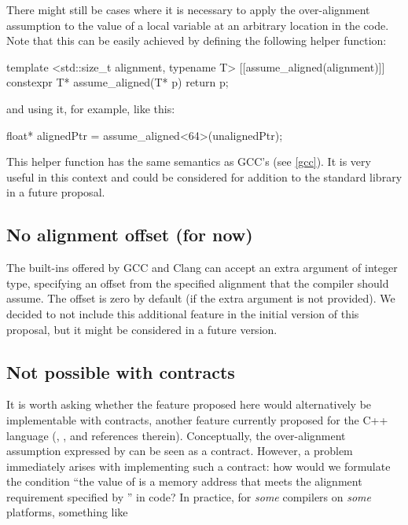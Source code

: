 There might still be cases where it is  necessary to apply the over-alignment assumption to the value of a local variable at an arbitrary location in the code. Note that this can be easily achieved by defining the following helper function:

\begin{codeblock}
template <std::size_t alignment, typename T>
[[assume_aligned(alignment)]] constexpr T* assume_aligned(T* p)
{
   return p;
}
\end{codeblock}
and using it, for example, like this:
\begin{codeblock}
float* alignedPtr = assume_aligned<64>(unalignedPtr);
\end{codeblock}

This helper function has the same semantics as GCC's  (see \ref{gcc}). It is very useful in this context and could be considered for addition to the standard library in a future proposal.

\subsection{No alignment offset (for now)} \label{offset}

The  built-ins offered by GCC and Clang can accept an extra argument of integer type, specifying an offset from the specified alignment that the compiler should assume. The offset is zero by default (if the extra argument is not provided). We decided to not include this additional feature in the initial version of this proposal, but it might be considered in a future version.

\subsection{Not possible with contracts}

It is worth asking whether the feature proposed here would alternatively be implementable with contracts, another feature currently proposed for the C++ language (\cite{P0147R0}, \cite{P0542R2}, and references therein). Conceptually, the over-alignment assumption expressed by  can be seen as a contract. However, a problem immediately arises with implementing such a contract: how would we formulate the condition ``the value of  is a memory address that meets the alignment requirement specified by '' in code? In practice, for \emph{some} compilers on \emph{some} platforms, something like

